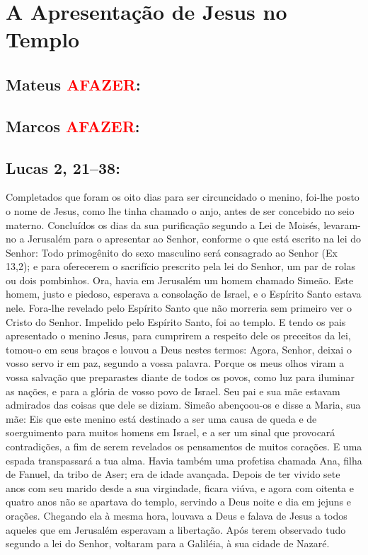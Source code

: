 \documentclass[10pt,a5paper]{book}
\newcommand{\from}[1]{\subsection*{#1}}
\newcommand{\TODO}{\textcolor{red}{\ttfamily AFAZER}}
\begin{document}

\section{A Apresentação de Jesus no Templo}

\from{Mateus \TODO:}

\from{Marcos \TODO:}

\from{Lucas 2, 21--38:}

Completados que foram os oito dias para ser circuncidado o menino, foi-lhe posto o nome de Jesus, como lhe tinha chamado o anjo, antes de ser concebido no seio materno.
Concluídos os dias da sua purificação segundo a Lei de Moisés, levaram-no a Jerusalém para o apresentar ao Senhor,
conforme o que está escrito na lei do Senhor:
Todo primogênito do sexo masculino será consagrado ao Senhor (Ex 13,2);
e para oferecerem o sacrifício prescrito pela lei do Senhor, um par de rolas ou dois pombinhos.
Ora, havia em Jerusalém um homem chamado Simeão.
Este homem, justo e piedoso, esperava a consolação de Israel, e o Espírito Santo estava nele.
Fora-lhe revelado pelo Espírito Santo que não morreria sem primeiro ver o Cristo do Senhor.
Impelido pelo Espírito Santo, foi ao templo.
E tendo os pais apresentado o menino Jesus, para cumprirem a respeito dele os preceitos da lei,
tomou-o em seus braços e louvou a Deus nestes termos:
Agora, Senhor, deixai o vosso servo ir em paz, segundo a vossa palavra.
Porque os meus olhos viram a vossa salvação
que preparastes diante de todos os povos,
como luz para iluminar as nações, e para a glória de vosso povo de Israel.
Seu pai e sua mãe estavam admirados das coisas que dele se diziam.
Simeão abençoou-os e disse a Maria, sua mãe:
Eis que este menino está destinado a ser uma causa de queda e de soerguimento para muitos homens em Israel, e a ser um sinal que provocará contradições,
a fim de serem revelados os pensamentos de muitos corações.
E uma espada transpassará a tua alma.
Havia também uma profetisa chamada Ana, filha de Fanuel, da tribo de Aser;
era de idade avançada.
Depois de ter vivido sete anos com seu marido desde a sua virgindade, ficara viúva, e agora com oitenta e quatro anos não se apartava do templo, servindo a Deus noite e dia em jejuns e orações.
Chegando ela à mesma hora, louvava a Deus e falava de Jesus a todos aqueles que em Jerusalém esperavam a libertação.
Após terem observado tudo segundo a lei do Senhor, voltaram para a Galiléia, à sua cidade de Nazaré.
\end{document}
